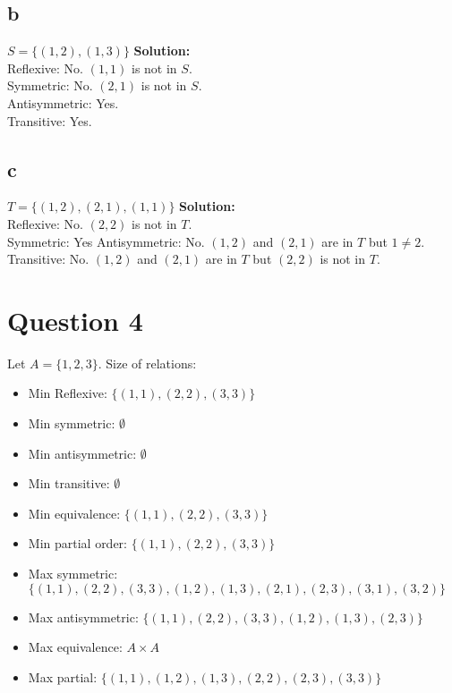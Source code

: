 \documentclass{article}
\begin{document}
\subsection*{b}
$S = \{(1,2),(1,3)\}$
\textbf{Solution:}\\
Reflexive: No. $(1,1)$ is not in $S$.\\
Symmetric: No. $(2,1)$ is not in $S$.\\
Antisymmetric: Yes. \\
Transitive: Yes.
\subsection*{c}
$T = \{(1,2),(2,1),(1,1)\}$
\textbf{Solution:}\\
Reflexive: No. $(2,2)$ is not in $T$.\\
Symmetric: Yes
Antisymmetric: No. $(1,2)$ and $(2,1)$ are in $T$ but $1 \neq 2$.\\
Transitive: No. $(1,2)$ and $(2,1)$ are in $T$ but $(2,2)$ is not in $T$.\\
\section*{Question 4}
Let $A = \{1,2,3\}$. Size of relations:
\begin{itemize}
    \item Min Reflexive: $\{(1,1),(2,2),(3,3) \}$
    \item Min symmetric: $\emptyset$
    \item Min antisymmetric: $\emptyset$
    \item Min transitive: $\emptyset$
    \item Min equivalence: $\{(1,1),(2,2),(3,3) \}$
    \item Min partial order: $\{(1,1),(2,2),(3,3) \}$
    \item Max symmetric: $\{(1,1),(2,2),(3,3),(1,2),(1,3),(2,1),(2,3),(3,1),(3,2)\} $
    \item Max antisymmetric: $\{(1,1),(2,2),(3,3),(1,2),(1,3),(2,3)\}$
    \item Max equivalence: $A \times A$
    \item Max partial: $\{(1,1),(1,2),(1,3),(2,2),(2,3),(3,3)\} $
\end{itemize}
\end{document}
